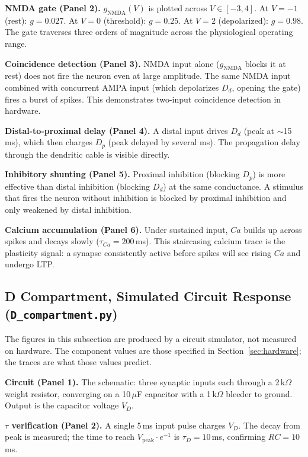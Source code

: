 \documentclass[12pt]{article}
\begin{document}
\textbf{NMDA gate (Panel 2).} $g_{\text{NMDA}}(V)$ is plotted across $V \in [-3, 4]$. At $V = -1$ (rest): $g = 0.027$. At $V = 0$ (threshold): $g = 0.25$. At $V = 2$ (depolarized): $g = 0.98$. The gate traverses three orders of magnitude across the physiological operating range.

\textbf{Coincidence detection (Panel 3).} NMDA input alone ($g_{\text{NMDA}}$ blocks it at rest) does not fire the neuron even at large amplitude. The same NMDA input combined with concurrent AMPA input (which depolarizes $D_d$, opening the gate) fires a burst of spikes. This demonstrates two-input coincidence detection in hardware.

\textbf{Distal-to-proximal delay (Panel 4).} A distal input drives $D_d$ (peak at $\sim$15\,ms), which then charges $D_p$ (peak delayed by several ms). The propagation delay through the dendritic cable is visible directly.

\textbf{Inhibitory shunting (Panel 5).} Proximal inhibition (blocking $D_p$) is more effective than distal inhibition (blocking $D_d$) at the same conductance. A stimulus that fires the neuron without inhibition is blocked by proximal inhibition and only weakened by distal inhibition.

\textbf{Calcium accumulation (Panel 6).} Under sustained input, $Ca$ builds up across spikes and decays slowly ($\tau_{Ca} = 200$\,ms). This staircasing calcium trace is the plasticity signal: a synapse consistently active before spikes will see rising $Ca$ and undergo LTP.

\subsection{D Compartment, Simulated Circuit Response (\texttt{D\_compartment.py})}

\noindent The figures in this subsection are produced by a circuit simulator, not measured on hardware. The component values are those specified in Section~\ref{sec:hardware}; the traces are what those values predict.

\textbf{Circuit (Panel 1).} The schematic: three synaptic inputs each through a 2\,k$\Omega$ weight resistor, converging on a 10\,$\mu$F capacitor with a 1\,k$\Omega$ bleeder to ground. Output is the capacitor voltage $V_D$.

\textbf{$\tau$ verification (Panel 2).} A single 5\,ms input pulse charges $V_D$. The decay from peak is measured; the time to reach $V_{\text{peak}} \cdot e^{-1}$ is $\tau_D = 10$\,ms, confirming $RC = 10$\,ms.
\end{document}
